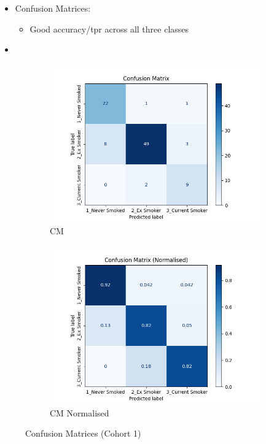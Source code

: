 \documentclass{article}
\begin{document}
\begin{itemize}
    \item Confusion Matrices:
          \begin{itemize}
              \item Good accuracy/tpr across all three classes
          \end{itemize}
    \item
\end{itemize}

\begin{figure}
    \begin{subfigure}{0.49\textwidth}
        \centering
        \includegraphics[width=\linewidth]{cohort1_cm.png}
        \caption{CM}
    \end{subfigure}
    \hfill
    \begin{subfigure}{0.49\textwidth}
        \centering
        \includegraphics[width=\linewidth]{cohort1_cm_n.png}
        \caption{CM Normalised}
    \end{subfigure}
    \caption{Confusion Matrices (Cohort 1)}
\end{figure}
\end{document}
